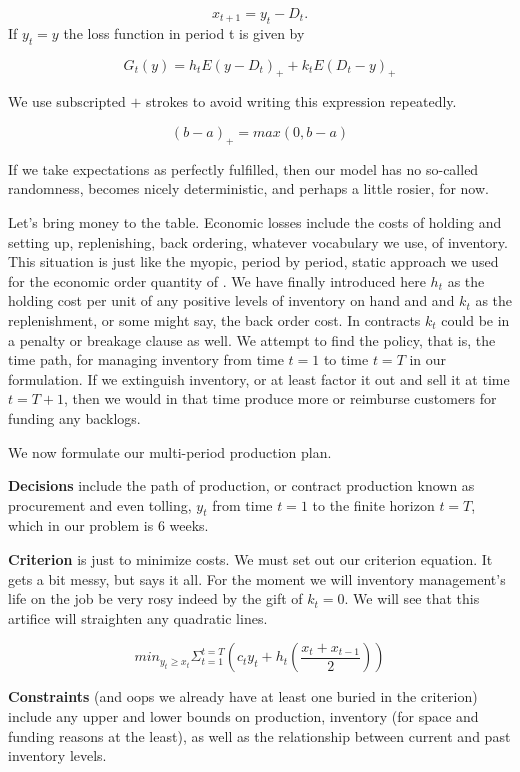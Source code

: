 \documentclass[
]{book}
\begin{document}
\[
x_{t+1} = y_t − D_t.
\]
If \(y_t = y\) the loss function in period t is given by

\[
G_t(y) = h_tE(y − D_t)_+ + k_tE(D_t − y)_+
\]

We use subscripted \(+\) strokes to avoid writing this expression repeatedly.

\[
(b-a)_+ = max(0, b-a)
\]

If we take expectations as perfectly fulfilled, then our model has no so-called randomness, becomes nicely deterministic, and perhaps a little rosier, for now.

Let's bring money to the table. Economic losses include the costs of holding and setting up, replenishing, back ordering, whatever vocabulary we use, of inventory. This situation is just like the myopic, period by period, static approach we used for the economic order quantity of \citet{Harris1913}. We have finally introduced here \(h_t\) as the holding cost per unit of any positive levels of inventory on hand and and \(k_t\) as the replenishment, or some might say, the back order cost. In contracts \(k_t\) could be in a penalty or breakage clause as well. We attempt to find the policy, that is, the time path, for managing inventory from time \(t=1\) to time \(t=T\) in our formulation. If we extinguish inventory, or at least factor it out and sell it at time \(t=T+1\), then we would in that time produce more or reimburse customers for funding any backlogs.

We now formulate our multi-period production plan.

\textbf{Decisions} include the path of production, or contract production known as procurement and even tolling, \(y_t\) from time \(t=1\) to the finite horizon \(t=T\), which in our problem is 6 weeks.

\textbf{Criterion} is just to minimize costs. We must set out our criterion equation. It gets a bit messy, but says it all. For the moment we will inventory management's life on the job be very rosy indeed by the gift of \(k_t=0\). We will see that this artifice will straighten any quadratic lines.

\[
min_{y_t \geq x_t} \Sigma_{t=1}^{t=T} \left(c_t y_t + h_t \left(\frac{x_t + x_{t-1}}{2}\right)\right)
\]

\textbf{Constraints} (and oops we already have at least one buried in the criterion) include any upper and lower bounds on production, inventory (for space and funding reasons at the least), as well as the relationship between current and past inventory levels.
\end{document}
